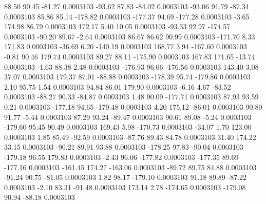        88.50       90.45      -81.27     0.0003103
      -93.62       87.83      -84.02     0.0003103
      -93.06       91.79      -87.34     0.0003103
       85.86       85.14     -178.82     0.0003103
     -177.37       94.69     -177.28     0.0003103
       -3.65      174.98       86.79     0.0003103
      172.17        5.40       10.05     0.0003103
      -93.33       92.97     -174.57     0.0003103
      -90.20       89.67       -2.64     0.0003103
       86.67       86.62       90.99     0.0003103
     -171.70        8.33      171.83     0.0003103
      -36.69        6.20     -140.19     0.0003103
      168.77        3.94     -167.60     0.0003103
       -0.81       90.46      179.74     0.0003103
       89.27       88.11     -175.90     0.0003103
      167.83      171.65      -13.74     0.0003103
       -1.63       88.38        2.48     0.0003103
     -176.93       96.06     -176.56     0.0003103
      143.40        3.08       37.07     0.0003103
      179.37       87.01      -88.88     0.0003103
     -178.39       95.74     -179.86     0.0003103
        2.10       95.75        1.54     0.0003103
       94.84       86.01      179.90     0.0003103
       -6.16        4.67      -83.52     0.0003103
      -88.27       90.33      -84.87     0.0003103
        1.48       90.09     -177.71     0.0003103
       87.93       93.59        0.21     0.0003103
     -177.18       94.65     -179.48     0.0003103
        4.20      175.12      -86.01     0.0003103
       90.80       91.77       -5.44     0.0003103
       87.29       93.24      -89.47     0.0003103
       90.61       89.08       -5.24     0.0003103
     -179.60       95.45       90.49     0.0003103
      169.43        5.98     -170.73     0.0003103
      -34.07        1.70      123.00     0.0003103
        1.85       85.49      -92.59     0.0003103
      -87.76       89.43       84.78     0.0003103
       31.40      174.22       33.15     0.0003103
      -90.21       89.91       93.88     0.0003103
     -178.25       97.83      -90.04     0.0003103
     -179.18       96.55      179.83     0.0003103
       -2.43       96.06     -177.82     0.0003103
     -177.35       89.69     -177.16     0.0003103
     -161.45      174.27     -163.06     0.0003103
      -89.72       89.75       84.88     0.0003103
      -91.24       90.75      -81.05     0.0003103
        1.82       98.17     -179.10     0.0003103
       91.18       89.89      -87.22     0.0003103
       -2.10       83.31      -91.48     0.0003103
      173.14        2.78     -174.65     0.0003103
     -179.08       90.94      -88.18     0.0003103

